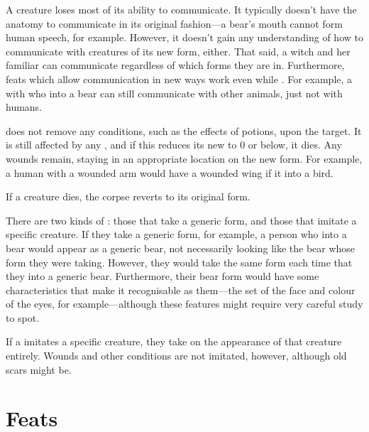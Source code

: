 A {\transformed} creature loses most of its ability to communicate.
It typically doesn't have the anatomy to communicate in its original fashion---a bear's mouth cannot form human speech, for example.
However, it doesn't gain any understanding of how to communicate with creatures of its new form, either.
That said, a witch and her familiar can communicate regardless of which forms they are in.
Furthermore, feats which allow communication in new ways work even while {\transformed}.
For example, a  with  who {\transforms} into a bear can still communicate with other animals, just not with humans.

\capital{\transformation} does not remove any conditions, such as the effects of potions, upon the target.
It is still affected by any {\damage}, and if this reduces its new  to 0 or below, it dies.
Any wounds remain, staying in an appropriate location on the new form.
For example, a human with a wounded arm would have a wounded wing if it {\transformed} into a bird.

If a {\transformed} creature dies, the corpse reverts to its original form.

There are two kinds of {\transformations}: those that take a generic form, and those that imitate a specific creature.
If they take a generic form, for example, a person who {\transforms} into a bear would appear as a generic bear, not necessarily looking like the bear whose form they were taking.
However, they would take the same form each time that they {\transform} into a generic bear.
Furthermore, their bear form would have some characteristics that make it recognisable as them---the set of the face and colour of the eyes, for example---although these features might require very careful study to spot.

If a {\transformation} imitates a specific creature, they take on the appearance of that creature entirely.
Wounds and other conditions are not imitated, however, although old scars might be.

\section{Feats}


